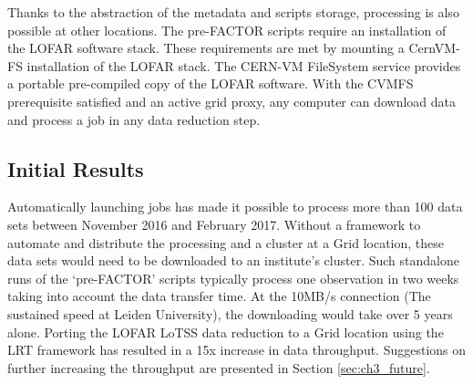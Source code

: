Thanks to the abstraction of the metadata and scripts storage, processing is also possible at other locations. The pre-FACTOR scripts require an installation of the LOFAR software stack\cite{lofar_stack}. These requirements are met by mounting a CernVM-FS\cite{cvmfs2008}\cite{softdrive} installation of the LOFAR stack. The CERN-VM FileSystem service provides a portable pre-compiled copy of the LOFAR software.  With the CVMFS prerequisite satisfied and an active grid proxy, any computer can download data and process a job in any data reduction step. 


\subsection{Initial Results}\label{sec:ch3_performance_results}

Automatically launching jobs has made it possible to process more than 100 data sets between November 2016 and February 2017. Without a framework to automate and distribute the processing and a cluster at a Grid location, these data sets would need to be downloaded to an institute's cluster. Such standalone runs of the `pre-FACTOR' scripts typically process one observation in two weeks taking into account the data transfer time.  At the 10MB/s connection (The sustained speed at Leiden University), the downloading would take over 5 years alone. Porting the LOFAR LoTSS data reduction to a Grid location using the LRT framework has resulted in a 15x increase in data throughput. Suggestions on further increasing the throughput are presented in Section \ref{sec:ch3_future}.
 
% 


